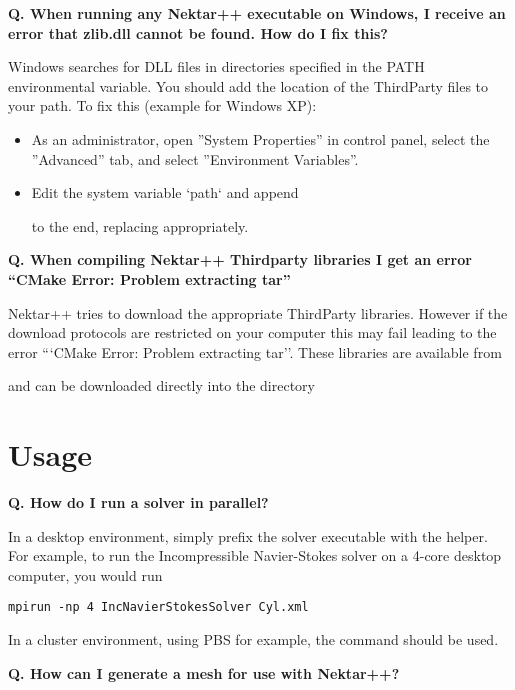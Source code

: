 \textbf{Q. When running any Nektar++ executable on Windows, I receive an error
that zlib.dll cannot be found. How do I fix this?}

Windows searches for DLL files in directories specified in the PATH
environmental variable. You should add the location of the ThirdParty files to
your path. To fix this (example for Windows XP):
\begin{itemize}
\item As an administrator, open ''System Properties'' in control panel, select
the ''Advanced'' tab, and select ''Environment Variables''.
\item Edit the system variable `path` and append


to the end, replacing
 appropriately.
\end{itemize}


\textbf{Q. When compiling Nektar++ Thirdparty libraries I get an error ``CMake
  Error: Problem extracting tar''}

Nektar++ tries to download the appropriate ThirdParty
libraries. However if the download protocols are restricted on your
computer this may fail leading to the error ```CMake Error: Problem
extracting tar''. These libraries are available from

\hspace{1cm} 

 and can be downloaded directly into the
 directory

\section{Usage}
\textbf{Q. How do I run a solver in parallel?}

In a desktop environment, simply prefix the solver executable with the
 helper. For example, to run the Incompressible Navier-Stokes
solver on a 4-core desktop computer, you would run
\begin{lstlisting}[style=BashInputStyle]
mpirun -np 4 IncNavierStokesSolver Cyl.xml
\end{lstlisting}
In a cluster environment, using PBS for example, the  command
should be used.


\textbf{Q. How can I generate a mesh for use with Nektar++?}

